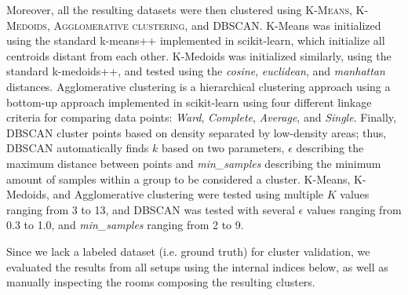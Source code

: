 Moreover, all the resulting datasets were then clustered using \textsc{K-Means, K-Medoids, Agglomerative clustering}, and \textsc{DBSCAN}. K-Means was initialized using the standard k-means++ implemented in scikit-learn, which initialize all centroids distant from each other. K-Medoids was initialized similarly, using the standard k-medoids++, and tested using the \emph{cosine}, \emph{euclidean}, and \emph{manhattan} distances. Agglomerative clustering is a hierarchical clustering approach using a bottom-up approach implemented in scikit-learn using four different linkage criteria for comparing data points: \emph{Ward}, \emph{Complete}, \emph{Average}, and \emph{Single}. Finally, DBSCAN cluster points based on density separated by low-density areas; thus, DBSCAN automatically finds $k$ based on two parameters, $\epsilon$ describing the maximum distance between points and \emph{min\_samples} describing the minimum amount of samples within a group to be considered a cluster. K-Means, K-Medoids, and Agglomerative clustering were tested using multiple $K$ values ranging from 3 to 13, and DBSCAN was tested with several $\epsilon$ values ranging from 0.3 to 1.0, and \emph{min\_samples} ranging from 2 to 9.



Since we lack a labeled dataset (i.e. ground truth) for cluster validation, we evaluated the results from all setups using the internal indices below, as well as manually inspecting the rooms composing the resulting clusters.


